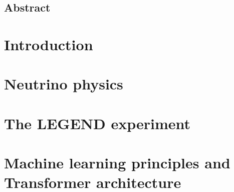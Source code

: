 \documentclass[11pt]{article}
\numberwithin{equation}{section} %
\begin{document}

\pagestyle{plain} 



\clearpage
\begin{center}
\section*{Abstract}
\end{center}




\clearpage
\tableofcontents 


\clearpage
\pagestyle{fancy} 
\section{Introduction}
\label{sec:01_introduction}
 


\clearpage
\section{Neutrino physics} 
\label{sec:02_neutrino}
 


\clearpage
\section{The LEGEND experiment} 
\label{sec:03_legend}
 


\clearpage
\section{Machine learning principles and Transformer architecture} 
\label{sec:04_transformer}



\clearpage
\end{document}
